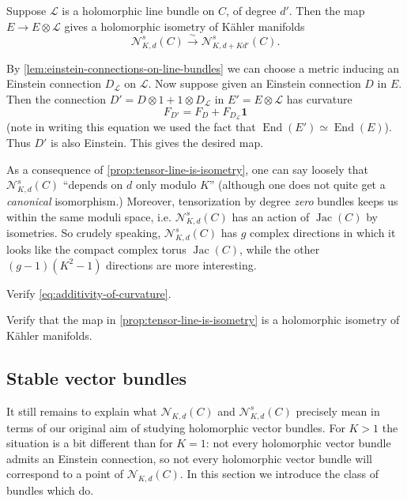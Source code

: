 \documentclass[12pt,letterpaper,reqno]{article}
\numberwithin{equation}{section}
\newcommand{\cL}{\ensuremath{\mathcal L}}
\newcommand{\cN}{\ensuremath{\mathcal N}}
\newcommand{\kahler}{K\"ahler\xspace}
\newcommand\bid{{\mathbf 1}}
\newcommand{\simarrow}{\xrightarrow\sim}
\newcommand{\ti}[1]{\textit{#1}}
\DeclareMathOperator{\End}{End}
\DeclareMathOperator{\Jac}{Jac}
\begin{document}
\begin{prop} \label{prop:tensor-line-is-isometry}
Suppose $\cL$ is a holomorphic line bundle on $C$, of degree $d'$.
Then the map $E \to E \otimes \cL$ gives a holomorphic
isometry of \kahler manifolds
\begin{equation}
\cN^s_{K,d}(C) \simarrow \cN^s_{K,d+Kd'}(C).
\end{equation}
\end{prop}
\begin{pf}
By \autoref{lem:einstein-connections-on-line-bundles} we can choose
a metric inducing an Einstein connection $D_\cL$ on $\cL$. Now
suppose given an Einstein connection $D$ in $E$. Then the connection
$D' = D \otimes 1 + 1 \otimes D_\cL$ in $E' = E \otimes \cL$ has curvature
\begin{equation} \label{eq:additivity-of-curvature}
 F_{D'} = F_D + F_{D_\cL} \bid
\end{equation}
(note in writing this equation we used
the fact that $\End(E') \simeq \End(E)$).
Thus $D'$ is also Einstein. This gives the desired map.
\end{pf}

As a consequence of \autoref{prop:tensor-line-is-isometry}, one can say
loosely that $\cN_{K,d}^s(C)$ ``depends on $d$ only modulo $K$''
(although one does not quite get a \ti{canonical} isomorphism.)
Moreover, tensorization by degree \ti{zero} bundles keeps us within
the same moduli space, i.e. $\cN_{K,d}^s(C)$ has an action of $\Jac(C)$ by isometries.
So crudely speaking, $\cN_{K,d}^s(C)$ has $g$ complex directions in which
it looks like the compact complex torus $\Jac(C)$, while the other
$(g-1)(K^2-1)$ directions are more interesting.

\begin{exercise} Verify \eqref{eq:additivity-of-curvature}.
\end{exercise}

\begin{exercise} Verify that the map in
\autoref{prop:tensor-line-is-isometry} is a holomorphic
isometry of \kahler manifolds.
\end{exercise}




\subsection{Stable vector bundles}

It still remains to explain what $\cN_{K,d}(C)$ and $\cN_{K,d}^s(C)$ precisely
mean in terms of our original aim of studying holomorphic vector bundles.
For $K > 1$ the situation is a bit different than for $K=1$:
not every holomorphic vector bundle admits an Einstein connection,
so not every holomorphic vector bundle will correspond to a point of
$\cN_{K,d}(C)$.
In this section we introduce the class of bundles which do.
\end{document}
